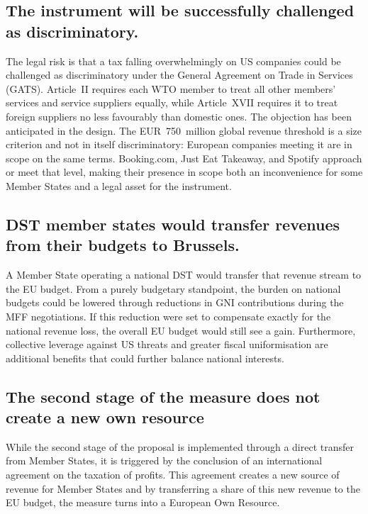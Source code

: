 \documentclass[../../main]{subfiles}
\begin{document}
\subsection*{The instrument will be successfully challenged as discriminatory.}

The legal risk is that a tax falling overwhelmingly on US companies could be challenged as discriminatory under the General Agreement on Trade in Services (GATS).
Article~II requires each WTO member to treat all other members' services and service suppliers equally, while Article~XVII requires it to treat foreign suppliers no less favourably than domestic ones.
The objection has been anticipated in the design.
The EUR~750~million global revenue threshold is a size criterion and not in itself discriminatory: European companies meeting it are in scope on the same terms. Booking.com, Just Eat Takeaway, and Spotify approach or meet that level, making their presence in scope both an inconvenience for some Member States and a legal asset for the instrument.


\subsection*{DST member states would transfer revenues from their budgets to Brussels.}
A Member State operating a national DST would transfer that revenue stream to the EU budget.
From a purely budgetary standpoint, the burden on national budgets could be lowered through reductions in GNI contributions during the MFF negotiations.
If this reduction were set to compensate exactly for the national revenue loss, the overall EU budget would still see a gain.
Furthermore, collective leverage against US threats and greater fiscal uniformisation are additional benefits that could further balance national interests.

\subsection*{The second stage of the measure does not create a new own resource}
While the second stage of the proposal is implemented through a direct transfer from Member States, it is triggered by the conclusion of an international agreement on the taxation of profits.
This agreement creates a new source of revenue for Member States and by transferring a share of this new revenue to the EU budget, the measure turns into a European Own Resource.
\end{document}
